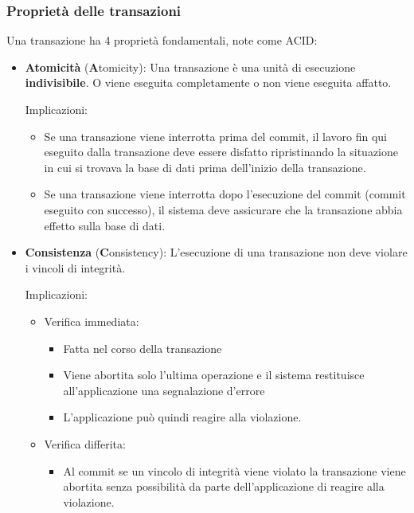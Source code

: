 \documentclass[a4paper,twoside]{article}
\begin{document}
\subsubsection{Proprietà delle transazioni}
Una transazione ha 4 proprietà fondamentali, note come ACID:
\begin{itemize}
  \item \textbf{Atomicità} (\textbf{A}tomicity):
    Una transazione è una unità di esecuzione \textbf{indivisibile}. O viene eseguita
    completamente o non viene eseguita affatto.

    \vspace{1em}
    \noindent
    Implicazioni:
    \begin{itemize}
      \item Se una transazione viene interrotta prima del commit, il lavoro fin qui
        eseguito dalla transazione deve essere disfatto ripristinando la situazione in
        cui si trovava la base di dati prima dell’inizio della transazione.

      \item Se una transazione viene interrotta dopo l’esecuzione del commit (commit
        eseguito con successo), il sistema deve assicurare che la transazione abbia
        effetto sulla base di dati.
    \end{itemize}

  \item \textbf{Consistenza} (\textbf{C}onsistency):
    L’esecuzione di una transazione non deve violare i vincoli di integrità.

    \vspace{1em}
    \noindent
    Implicazioni:
    \begin{itemize}
      \item Verifica immediata:
        \begin{itemize}
          \item Fatta nel corso della transazione
          \item Viene abortita solo l’ultima operazione e il sistema restituisce
            all’applicazione una segnalazione d’errore
          \item L’applicazione può quindi reagire alla violazione.
        \end{itemize}

      \item Verifica differita:
        \begin{itemize}
          \item Al commit se un vincolo di integrità viene violato la transazione viene
            abortita senza possibilità da parte dell’applicazione di reagire alla
            violazione.
        \end{itemize}
    \end{itemize}


\end{itemize}
\end{document}
